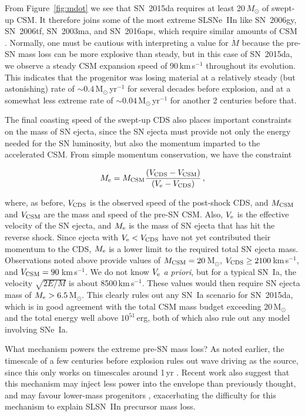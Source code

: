 \documentclass[fleqn,usenatbib,useAMS]{mnras}
\begin{document}
From Figure~\ref{fig:mdot} we see that SN~2015da requires at least
20\,$M_{\odot}$ of swept-up CSM.  It therefore joins some of the most
extreme SLSNe~IIn like SN~2006gy, SN~2006tf, SN~2003ma, and SN~2016aps, which require
similar amounts of CSM
\citep{sm07,smith08tf,smith10,woosley07,rest11,nicholl20}.
Normally, one must be cautious with interpreting a value for $\dot{M}$
because the pre-SN mass loss can be more explosive than steady, but in
this case of SN~2015da, we observe a steady CSM expansion speed of 90\,km\,s$^{-1}$ throughout its evolution.  This indicates that the progenitor
was losing material at a relatively steady (but astonishing) rate of
$\sim 0.4$\,M$_{\odot}$\,yr$^{-1}$ for several decades before explosion,
and at a somewhat less extreme rate of $\sim 0.04$\,M$_{\odot}$\,yr$^{-1}$ for another 2 centuries before that.

The final coasting speed of the swept-up CDS also places important constraints on the mass of SN ejecta, since the SN ejecta must provide not only the energy needed for the SN luminosity, but also the momentum imparted to the accelerated CSM.  From simple momentum conservation, we have the constraint

\begin{equation}
M_{\rm e} = M_{\rm CSM}  \frac{(V_{\rm CDS} - V_{\rm CSM})}{(V_{\rm e} - V_{\rm CDS})}\, ,
\end{equation}

\noindent where, as before, $V_{\rm CDS}$ is the observed speed of the post-shock CDS, and $M_{\rm CSM}$ and $V_{\rm CSM}$ are the mass and speed of the pre-SN CSM.  Also, $V_{\rm e}$ is the effective velocity of the SN ejecta, and $M_{\rm e}$ is the mass of SN ejecta that has hit the reverse shock.  Since ejecta with $V_{\rm e} < V_{\rm CDS}$ have not yet contributed their momentum to the CDS, $M_{\rm e}$ is a lower limit to the required total SN ejecta mass.  Observations noted above provide values of $M_{\rm CSM} = 20$\,M$_{\odot}$, $V_{\rm CDS} \ge 2100$\,km\,s$^{-1}$, and $V_{\rm CSM} = 90$\,km\,s$^{-1}$.  We do not know $V_{\rm e}$ {\it a priori}, but for a typical SN~Ia, the velocity $\sqrt{2E/M}$ is about 8500\,km\,s$^{-1}$.  These values would then require SN ejecta mass of $M_{\rm e} > 6.5$\,M$_{\odot}$.  This clearly rules out any SN~Ia scenario for SN~2015da, which is in good agreement with the total CSM mass budget exceeding 20\,M$_{\odot}$ and the total energy well above $10^{51}$\,erg, both of which also rule out
any model involving SNe~Ia.  

What mechanism powers the extreme pre-SN mass loss?  As noted earlier, the timescale of a few
centuries before explosion rules out wave driving as the source,
since this only works on
timescales around 1\,yr \citep{qs12,sq14,fuller17}.  Recent work also suggest that this mechanism may inject less power into the envelope than previously thought, and may favour lower-mass progenitors \citep{wf21}, exacerbating the difficulty for this mechanism to explain SLSN~IIn precursor mass loss.
\end{document}
